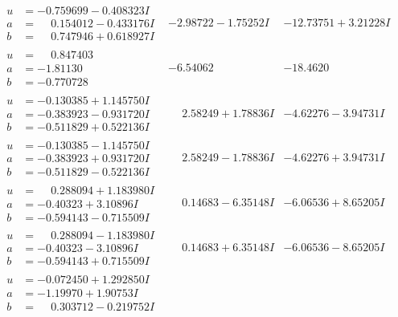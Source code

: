 \documentclass[1p]{elsarticle_modified}
\theoremstyle{definition}
\begin{document}
$$\begin{array}{c|c|c}
\begin{aligned}
u &= -0.759699 - 0.408323 I \\
a &= \phantom{-}0.154012 - 0.433176 I \\
b &= \phantom{-}0.747946 + 0.618927 I\end{aligned}
 & -2.98722 - 1.75252 I & -12.73751 + 3.21228 I \\ \hline\begin{aligned}
u &= \phantom{-}0.847403\phantom{ +0.000000I} \\
a &= -1.81130\phantom{ +0.000000I} \\
b &= -0.770728\phantom{ +0.000000I}\end{aligned}
 & -6.54062\phantom{ +0.000000I} & -18.4620\phantom{ +0.000000I} \\ \hline\begin{aligned}
u &= -0.130385 + 1.145750 I \\
a &= -0.383923 - 0.931720 I \\
b &= -0.511829 + 0.522136 I\end{aligned}
 & \phantom{-}2.58249 + 1.78836 I & -4.62276 - 3.94731 I \\ \hline\begin{aligned}
u &= -0.130385 - 1.145750 I \\
a &= -0.383923 + 0.931720 I \\
b &= -0.511829 - 0.522136 I\end{aligned}
 & \phantom{-}2.58249 - 1.78836 I & -4.62276 + 3.94731 I \\ \hline\begin{aligned}
u &= \phantom{-}0.288094 + 1.183980 I \\
a &= -0.40323 + 3.10896 I \\
b &= -0.594143 - 0.715509 I\end{aligned}
 & \phantom{-}0.14683 - 6.35148 I & -6.06536 + 8.65205 I \\ \hline\begin{aligned}
u &= \phantom{-}0.288094 - 1.183980 I \\
a &= -0.40323 - 3.10896 I \\
b &= -0.594143 + 0.715509 I\end{aligned}
 & \phantom{-}0.14683 + 6.35148 I & -6.06536 - 8.65205 I \\ \hline\begin{aligned}
u &= -0.072450 + 1.292850 I \\
a &= -1.19970 + 1.90753 I \\
b &= \phantom{-}0.303712 - 0.219752 I\end{aligned}

\end{array}$$
\end{document}
